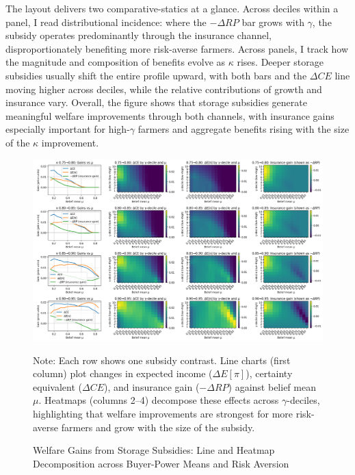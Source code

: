 The layout delivers two comparative-statics at a glance. Across deciles within a panel, I read distributional incidence: where the $-\Delta RP$ bar grows with $\gamma$, the subsidy operates predominantly through the insurance channel, disproportionately benefiting more risk-averse farmers. Across panels, I track how the magnitude and composition of benefits evolve as $\kappa$ rises. Deeper storage subsidies usually shift the entire profile upward, with both bars and the $\Delta CE$ line moving higher across deciles, while the relative contributions of growth and insurance vary. Overall, the figure shows that storage subsidies generate meaningful welfare improvements through both channels, with insurance gains especially important for high-$\gamma$ farmers and aggregate benefits rising with the size of the $\kappa$ improvement.


\begin{figure}[ht!]
    \centering
    \includegraphics[width=\linewidth]{model_figures/storage_subsidy_gain_heatmap.png}
    \caption{Welfare Gains from Storage Subsidies: Line and Heatmap Decomposition across Buyer-Power Means and Risk Aversion}
    \label{fig: storage_subsidy_gain_heatmap}
    \begin{tablenotes}
    \footnotesize
    \item Note: Each row shows one subsidy contrast. Line charts (first column) plot changes in expected income ($\Delta E[\pi]$), certainty equivalent ($\Delta CE$), and insurance gain ($-\Delta RP$) against belief mean $\mu$. Heatmaps (columns 2--4) decompose these effects across $\gamma$-deciles, highlighting that welfare improvements are strongest for more risk-averse farmers and grow with the size of the subsidy.
    \end{tablenotes}
\end{figure}

